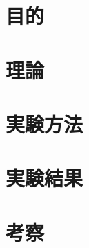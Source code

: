 \documentclass[a4paper,11pt]{jarticle}
\begin{document}
\tableofcontents
\thispagestyle{empty}
\clearpage
\setcounter{page}{1}

\twocolumn
\section{目的}
\section{理論}
\section{実験方法}
\section{実験結果}
\section{考察}

\nocite{*}


\end{document}
